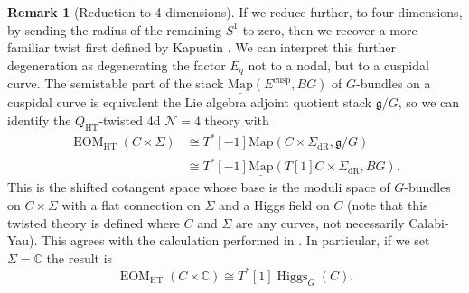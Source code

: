 \documentclass[11pt, oneside, reqno]{amsart}
\theoremstyle{definition} \newtheorem{definition}{Definition}[section]
\theoremstyle{definition} \newtheorem{remark}[definition]{Remark}
\theoremstyle{definition} \newtheorem{remarks}[definition]{Remarks}
\theoremstyle{definition} \newtheorem{question}[definition]{Question}
\theoremstyle{definition} \newtheorem*{note}{Note}
\theoremstyle{definition} \newtheorem{example}[definition]{Example}
\theoremstyle{definition} \newtheorem{examples}[definition]{Examples}
\renewcommand{\gg}{\mathfrak{g}}
\newcommand{\mr}[1]{\mathrm{#1}}
\newcommand{\mc}[1]{\mathcal{#1}}
\newcommand{\ul}[1]{\underline{#1}}
\newcommand{\CC}{\mathbb{C}}
\newcommand{\iso}{\cong}
\DeclareMathOperator{\higgs}{Higgs}
\DeclareMathOperator{\EOM}{EOM}
\newcommand{\map}{\ul{\mr{Map}}}
\newcommand{\HT}{\mr{HT}}
\begin{document}
\begin{remark}[Reduction to 4-dimensions]
If we reduce further, to four dimensions, by sending the radius of the remaining $S^1$ to zero, then we recover a more familiar twist first defined by Kapustin \cite{KapustinHolo}.  We can interpret this further degeneration as degenerating the factor $E_q$ not to a nodal, but to a cuspidal curve.  The semistable part of the stack $\map(E^{\mr{cusp}},BG)$ of $G$-bundles on a cuspidal curve is equivalent the Lie algebra adjoint quotient stack $\gg/G$, so we can identify the $Q_\HT$-twisted 4d $\mc N=4$ theory with
\begin{align*}
\EOM_\HT(C \times \Sigma) &\iso T^*[-1]\map(C \times \Sigma_{\mr{dR}}, \gg/G) \\
&\iso T^*[-1]\map(T[1]C \times \Sigma_{\mr{dR}}, BG).
\end{align*}
This is the shifted cotangent space whose base is the moduli space of $G$-bundles on $C \times \Sigma$ with a flat connection on $\Sigma$ and a Higgs field on $C$ (note that this twisted theory is defined where $C$ and $\Sigma$ are any curves, not necessarily Calabi-Yau).  This agrees with the calculation performed in \cite{ElliottYoo1}.  In particular, if we set $\Sigma = \CC$ the result is
\[\EOM_\HT(C \times \CC) \iso T^*[1]\higgs_G(C).\]
\end{remark}
\end{document}
